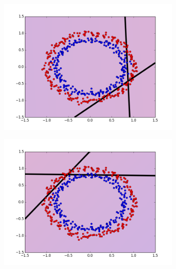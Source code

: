 \begin{figure}[H]
\medskip
\begin{subfigure}{0.48\textwidth}
\includegraphics[width=\linewidth]{figs/Circle/33-two-circle}
\caption{} \label{fig:Circle_all_single_c}
\end{subfigure}\hspace*{\fill}
\begin{subfigure}{0.48\textwidth}
\includegraphics[width=\linewidth]{figs/Circle/44-two-circle}
\caption{} \label{fig:Circle_all_single_d}
\end{subfigure}


\end{figure}
